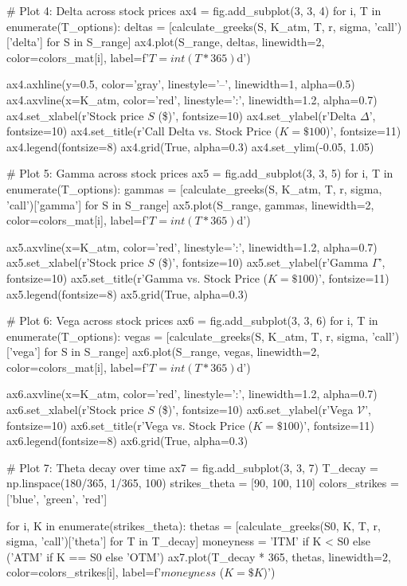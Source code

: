 \documentclass[a4paper, 11pt]{article}
\begin{document}
\begin{pycode}
# Plot 4: Delta across stock prices
ax4 = fig.add_subplot(3, 3, 4)
for i, T in enumerate(T_options):
    deltas = [calculate_greeks(S, K_atm, T, r, sigma, 'call')['delta'] for S in S_range]
    ax4.plot(S_range, deltas, linewidth=2, color=colors_mat[i], label=f'$T={int(T*365)}$d')

ax4.axhline(y=0.5, color='gray', linestyle='--', linewidth=1, alpha=0.5)
ax4.axvline(x=K_atm, color='red', linestyle=':', linewidth=1.2, alpha=0.7)
ax4.set_xlabel(r'Stock price $S$ (\$)', fontsize=10)
ax4.set_ylabel(r'Delta $\Delta$', fontsize=10)
ax4.set_title(r'Call Delta vs. Stock Price ($K=\$100$)', fontsize=11)
ax4.legend(fontsize=8)
ax4.grid(True, alpha=0.3)
ax4.set_ylim(-0.05, 1.05)

# Plot 5: Gamma across stock prices
ax5 = fig.add_subplot(3, 3, 5)
for i, T in enumerate(T_options):
    gammas = [calculate_greeks(S, K_atm, T, r, sigma, 'call')['gamma'] for S in S_range]
    ax5.plot(S_range, gammas, linewidth=2, color=colors_mat[i], label=f'$T={int(T*365)}$d')

ax5.axvline(x=K_atm, color='red', linestyle=':', linewidth=1.2, alpha=0.7)
ax5.set_xlabel(r'Stock price $S$ (\$)', fontsize=10)
ax5.set_ylabel(r'Gamma $\Gamma$', fontsize=10)
ax5.set_title(r'Gamma vs. Stock Price ($K=\$100$)', fontsize=11)
ax5.legend(fontsize=8)
ax5.grid(True, alpha=0.3)

# Plot 6: Vega across stock prices
ax6 = fig.add_subplot(3, 3, 6)
for i, T in enumerate(T_options):
    vegas = [calculate_greeks(S, K_atm, T, r, sigma, 'call')['vega'] for S in S_range]
    ax6.plot(S_range, vegas, linewidth=2, color=colors_mat[i], label=f'$T={int(T*365)}$d')

ax6.axvline(x=K_atm, color='red', linestyle=':', linewidth=1.2, alpha=0.7)
ax6.set_xlabel(r'Stock price $S$ (\$)', fontsize=10)
ax6.set_ylabel(r'Vega $\mathcal{V}$', fontsize=10)
ax6.set_title(r'Vega vs. Stock Price ($K=\$100$)', fontsize=11)
ax6.legend(fontsize=8)
ax6.grid(True, alpha=0.3)

# Plot 7: Theta decay over time
ax7 = fig.add_subplot(3, 3, 7)
T_decay = np.linspace(180/365, 1/365, 100)
strikes_theta = [90, 100, 110]
colors_strikes = ['blue', 'green', 'red']

for i, K in enumerate(strikes_theta):
    thetas = [calculate_greeks(S0, K, T, r, sigma, 'call')['theta'] for T in T_decay]
    moneyness = 'ITM' if K < S0 else ('ATM' if K == S0 else 'OTM')
    ax7.plot(T_decay * 365, thetas, linewidth=2, color=colors_strikes[i],
             label=f'${moneyness}$ ($K=\${K}$)')


\end{pycode}
\end{document}
